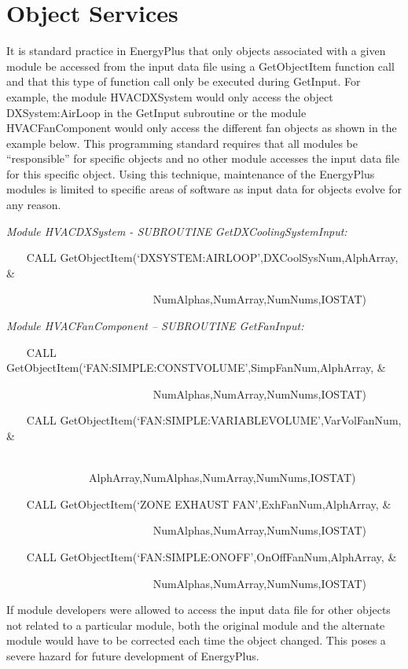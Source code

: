 \section{Object Services}\label{object-services}

It is standard practice in EnergyPlus that only objects associated with a given module be accessed from the input data file using a GetObjectItem function call and that this type of function call only be executed during GetInput. For example, the module HVACDXSystem would only access the object DXSystem:AirLoop in the GetInput subroutine or the module HVACFanComponent would only access the different fan objects as shown in the example below. This programming standard requires that all modules be ``responsible'' for specific objects and no other module accesses the input data file for this specific object. Using this technique, maintenance of the EnergyPlus modules is limited to specific areas of software as input data for objects evolve for any reason.

\emph{Module HVACDXSystem - SUBROUTINE GetDXCoolingSystemInput:}

~~~ CALL GetObjectItem(`DXSYSTEM:AIRLOOP',DXCoolSysNum,AlphArray, \&

~~~~~~~~~~~~~~~~~~~~~~~~~~ NumAlphas,NumArray,NumNums,IOSTAT)

\emph{Module HVACFanComponent -- SUBROUTINE GetFanInput:}

~~~ CALL GetObjectItem(`FAN:SIMPLE:CONSTVOLUME',SimpFanNum,AlphArray, \&

~~~~~~~~~~~~~~~~~~~~~~~~~~ NumAlphas,NumArray,NumNums,IOSTAT)

~~~ CALL GetObjectItem(`FAN:SIMPLE:VARIABLEVOLUME',VarVolFanNum, \&

~~~~~~~~~~~ ~~~~~~~~~~~~~~~AlphArray,NumAlphas,NumArray,NumNums,IOSTAT)

~~~ CALL GetObjectItem(`ZONE EXHAUST FAN',ExhFanNum,AlphArray, \&

~~~~~~~~~~~~~~~~~~~~~~~~~~ NumAlphas,NumArray,NumNums,IOSTAT)

~~~ CALL GetObjectItem(`FAN:SIMPLE:ONOFF',OnOffFanNum,AlphArray, \&

~ ~~~~~~~~~~~~~~~~~~~~~~~~~NumAlphas,NumArray,NumNums,IOSTAT)

If module developers were allowed to access the input data file for other objects not related to a particular module, both the original module and the alternate module would have to be corrected each time the object changed. This poses a severe hazard for future development of EnergyPlus.

